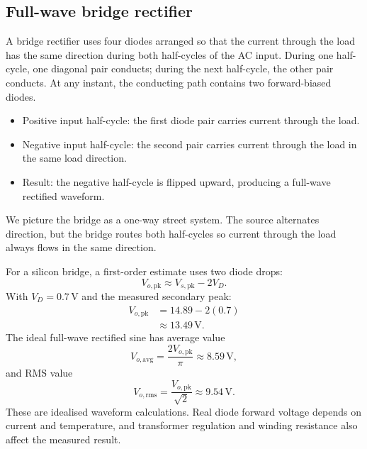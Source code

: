 \documentclass[journal,12pt,twocolumn]{IEEEtran}
\begin{document}
\subsection*{Full-wave bridge rectifier}
A bridge rectifier uses four diodes arranged so that the current
through the load has the same direction during both half-cycles of
the AC input. During one half-cycle, one diagonal pair conducts;
during the next half-cycle, the other pair conducts. At any instant,
the conducting path contains two forward-biased diodes.

\begin{itemize}[leftmargin=1.5em]
    \item Positive input half-cycle: the first diode pair carries
    current through the load.
    \item Negative input half-cycle: the second pair carries current
    through the load in the same load direction.
    \item Result: the negative half-cycle is flipped upward, producing
    a full-wave rectified waveform.
\end{itemize}

We picture the bridge as a one-way street system. The source alternates
direction, but the bridge routes both half-cycles so current through
the load always flows in the same direction.

For a silicon bridge, a first-order estimate uses two diode drops:
\begin{equation}
    \boxed{V_{o,\mathrm{pk}}\approx V_{s,\mathrm{pk}}-2V_D.}
    \label{eq:bridge-peak}
\end{equation}
With $V_D=0.7\,\mathrm{V}$ and the measured secondary peak:
\begin{align}
    V_{o,\mathrm{pk}}
    &=14.89-2(0.7)\\
    &\approx 13.49\,\mathrm{V}.
\end{align}
The ideal full-wave rectified sine has average value
\begin{equation}
    \boxed{V_{o,\mathrm{avg}}=\frac{2V_{o,\mathrm{pk}}}{\pi}}
    \approx 8.59\,\mathrm{V},
    \label{eq:rect-average}
\end{equation}
and RMS value
\begin{equation}
    \boxed{V_{o,\mathrm{rms}}=\frac{V_{o,\mathrm{pk}}}{\sqrt{2}}}
    \approx 9.54\,\mathrm{V}.
    \label{eq:rect-rms}
\end{equation}
These are idealised waveform calculations. Real diode forward
voltage depends on current and temperature, and transformer
regulation and winding resistance also affect the measured result.
\end{document}
